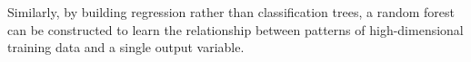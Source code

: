 
Similarly, by building regression rather than classification trees, a random forest can be constructed to learn the relationship between patterns of high-dimensional training data and a single output variable.

